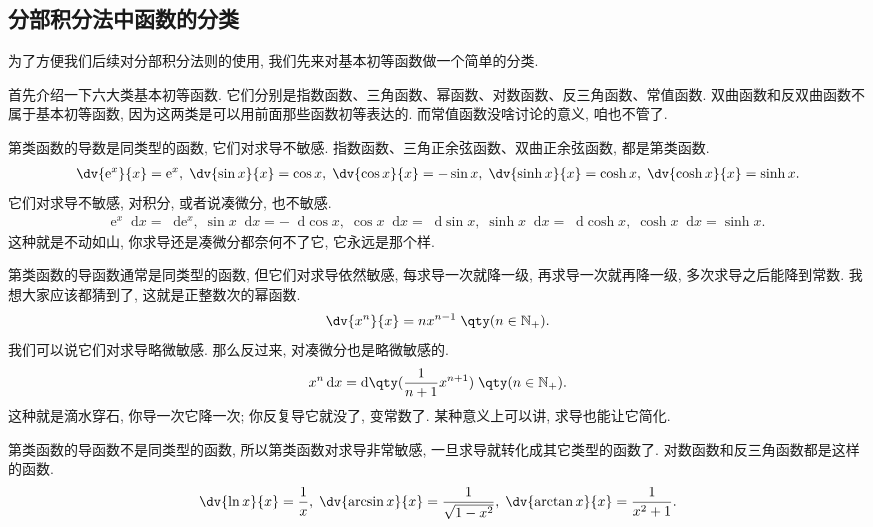 \documentclass{ctexbook}
\newcommand{\e}{\mathrm{e}}
\newcommand*{\dif}{\mathop{}\!\mathrm{d}}
\begin{document}
{\subsection{分部积分法中函数的分类}
为了方便我们后续对分部积分法则的使用, 我们先来对基本初等函数做一个简单的分类. \par
首先介绍一下六大类基本初等函数. 它们分别是指数函数、三角函数、幂函数、对数函数、反三角函数、常值函数. 双曲函数和反双曲函数不属于基本初等函数, 因为这两类是可以用前面那些函数初等表达的. 而常值函数没啥讨论的意义, 咱也不管了. \par
第\uppercase\expandafter{}类函数的导数是同类型的函数, 它们对求导不敏感. 指数函数、三角正余弦函数、双曲正余弦函数, 都是第\uppercase\expandafter{}类函数. 
\begin{align*}
\dv{\e^{x}}{x}=\e^{x},\;\dv{\sin{x}}{x}=\cos{x},\;\dv{\cos{x}}{x}=-\sin{x},\;\dv{\sinh{x}}{x}=\cosh{x},\;\dv{\cosh{x}}{x}=\sinh{x}
.\end{align*}
它们对求导不敏感, 对积分, 或者说凑微分, 也不敏感. 
\begin{align*}
\e^{x}\dif{x}=\dif{\e^{x}},\;\sin{x}\dif{x}=-\dif{\cos{x}},\;\cos{x}\dif{x}=\dif{\sin{x}},\;\sinh{x}\dif{x}=\dif{\cosh{x}},\;\cosh{x}\dif{x}=\sinh{x}
.\end{align*}
这种就是不动如山, 你求导还是凑微分都奈何不了它, 它永远是那个样. \par
第\uppercase\expandafter{}类函数的导函数通常是同类型的函数, 但它们对求导依然敏感, 每求导一次就降一级, 再求导一次就再降一级, 多次求导之后能降到常数. 我想大家应该都猜到了, 这就是正整数次的幂函数. 
\begin{align*}
\dv{x^{n}}{x}=nx^{n-1}\;\qty(n\in\mathbb{N_{+}})
.\end{align*}
我们可以说它们对求导略微敏感. 那么反过来, 对凑微分也是略微敏感的. 
\begin{align*}
x^{n}\dif{x}=\dif{\qty(\frac{1}{n+1}x^{n+1})}\;\qty(n\in\mathbb{N_{+}})
.\end{align*}
这种就是滴水穿石, 你导一次它降一次; 你反复导它就没了, 变常数了. 某种意义上可以讲, 求导也能让它简化. \par
第\uppercase\expandafter{}类函数的导函数不是同类型的函数, 所以第\uppercase\expandafter{}类函数对求导非常敏感, 一旦求导就转化成其它类型的函数了. 对数函数和反三角函数都是这样的函数. 
\begin{align*}
\dv{\ln{x}}{x}=\frac{1}{x},\;\dv{\arcsin{x}}{x}=\frac{1}{\sqrt{1-x^{2}}},\;\dv{\arctan{x}}{x}=\frac{1}{x^{2}+1}
.\end{align*}
}
\end{document}

